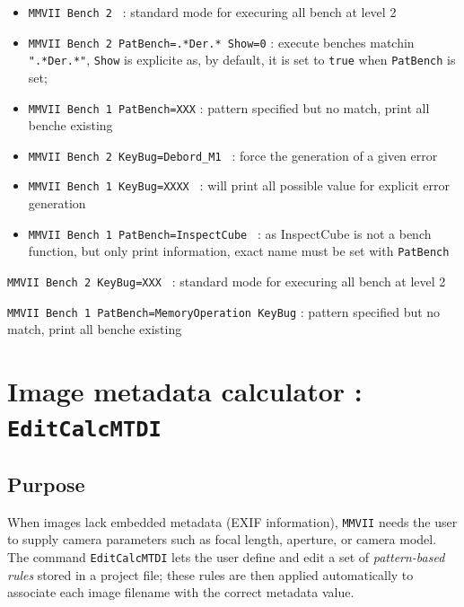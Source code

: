 \begin{itemize}
    \item {\tt  MMVII Bench 2 }  : standard mode  for execuring all bench at level 2

    \item {\tt MMVII Bench 2 PatBench=.*Der.* Show=0}  : execute benches matchin {\tt ".*Der.*"},
          {\tt  Show} is explicite as, by default, it is set to {\tt  true} 
          when {\tt  PatBench} is set;
   
    \item {\tt MMVII Bench 1 PatBench=XXX} : pattern specified but no match, print all benche existing


    \item {\tt MMVII Bench 2 KeyBug=Debord\_M1 }  : force the generation of  a given error

    \item {\tt MMVII Bench 1 KeyBug=XXXX }  : will print all possible value for explicit error generation


    \item {\tt MMVII Bench 1 PatBench=InspectCube }  : as InspectCube is not a bench function, but 
         only print information, exact name must be set with {\tt PatBench}

\end{itemize}






{\tt MMVII Bench 2 KeyBug=XXX }  : standard mode  for execuring all bench at level 2

{\tt MMVII Bench 1 PatBench=MemoryOperation KeyBug} : pattern specified but no match, print all benche existing



\section{Image metadata calculator : \texttt{EditCalcMTDI}}

\subsection{Purpose}

When images lack embedded metadata (EXIF information), {\tt MMVII} needs the user
to supply camera parameters such as focal length, aperture, or camera model.
The command {\tt EditCalcMTDI} lets the user define and edit a set of
\emph{pattern-based rules} stored in a project file; these rules are then applied
automatically to associate each image filename with the correct metadata value.

